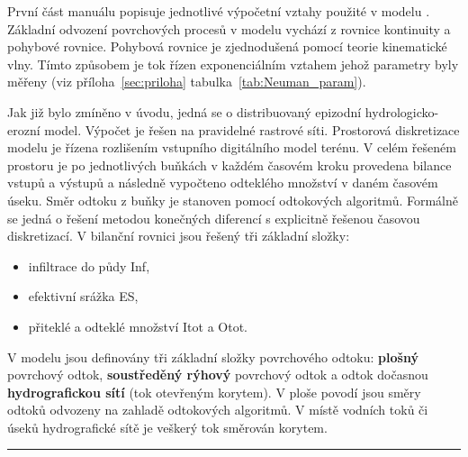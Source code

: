 %

První část manuálu popisuje jednotlivé výpočetní vztahy použité v modelu \smod. Základní odvození povrchových procesů v modelu \smod vychází z rovnice kontinuity a pohybové rovnice. Pohybová rovnice je zjednodušená pomocí teorie kinematické vlny. Tímto způsobem je tok řízen exponenciálním vztahem jehož parametry byly měřeny (viz  příloha~\ref{sec:priloha} tabulka~\ref{tab:Neuman_param}). 

Jak již bylo zmíněno v úvodu, jedná se o distribuovaný epizodní hydrologicko-erozní model. Výpočet je řešen na pravidelné rastrové síti. Prostorová diskretizace modelu je řízena  rozlišením vstupního digitálního model terénu. V celém řešeném prostoru je po jednotlivých buňkách v každém časovém kroku provedena bilance vstupů a výstupů a následně vypočteno odteklého množství v daném časovém úseku. Směr odtoku z buňky je stanoven pomocí odtokových algoritmů. Formálně se jedná o řešení metodou konečných diferencí s explicitně řešenou časovou diskretizací. V bilanční rovnici jsou řešený tři základní složky:


\begin{itemize}\itemsep 0cm
\item infiltrace do půdy \acs{Inf},
\item efektivní srážka \acs{ES},
\item přiteklé a odteklé množství \acs{Itot} a \acs{Otot}.
\end{itemize}


V modelu jsou definovány tři základní složky povrchového odtoku: \textbf{plošný} povrchový odtok, \textbf{soustředěný rýhový}  povrchový odtok a odtok dočasnou \textbf{hydrografickou sítí} (tok otevřeným korytem). V ploše povodí jsou směry odtoků odvozeny na zahladě odtokových algoritmů. V místě vodních toků či úseků hydrografické sítě je veškerý tok směrován korytem.\\
% 
% 
\rule{\textwidth}{0.3pt}



